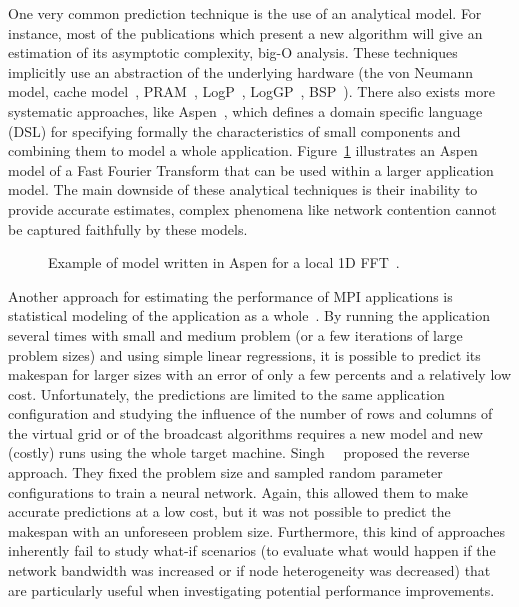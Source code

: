         One very common prediction technique is the use of an analytical model. For instance, most of the publications
        which present a new algorithm will give an estimation of its asymptotic complexity, \aka big-O analysis. These
        techniques implicitly use an abstraction of the underlying hardware (\eg the von Neumann model, cache
        model~\cite{cache_oblivious}, PRAM~\cite{pram}, LogP~\cite{logp}, LogGP~\cite{loggp}, BSP~\cite{bsp}). There
        also exists more systematic approaches, like Aspen~\cite{aspen}, which defines a domain specific language (DSL)
        for specifying formally the characteristics of small components and combining them to model a whole application.
        Figure~\ref{fig:aspen:example} illustrates an Aspen model of a Fast Fourier Transform that can be used within a
        larger application model. The main downside of these analytical techniques is their inability to provide
        accurate estimates, complex phenomena like network contention cannot be captured faithfully by these models.

        \begin{figure}[htpb]
            \centering
            \begin{minipage}[b]{\linewidth}
                \lstset{frame=bt,language=C,numbers=none,escapechar=|}
                
            \end{minipage}
            \caption{Example of model written in Aspen for a local 1D FFT~\cite{aspen}.}
            \label{fig:aspen:example}
        \end{figure}

        Another approach for estimating the performance of MPI applications is statistical modeling of the application
        as a whole~\cite{hpl_prediction}.  By running the application several times with small and medium problem (or a
        few iterations of large problem sizes) and using simple linear regressions, it is possible to predict its
        makespan for larger sizes with an error of only a few percents and a relatively low cost.  Unfortunately, the
        predictions are limited to the same application configuration and studying the influence of the number of rows
        and columns of the virtual grid or of the broadcast algorithms requires a new model and new (costly) runs using
        the whole target machine.  Singh~\etal~\cite{Singh_2007} proposed the reverse approach. They fixed the problem
        size and sampled random parameter configurations to train a neural network. Again, this allowed them to make
        accurate predictions at a low cost, but it was not possible to predict the makespan with an unforeseen problem
        size. Furthermore, this kind of approaches inherently fail to study what-if scenarios (\eg to evaluate what
        would happen if the network bandwidth was increased or if node heterogeneity was decreased) that are
        particularly useful when investigating potential performance improvements.

